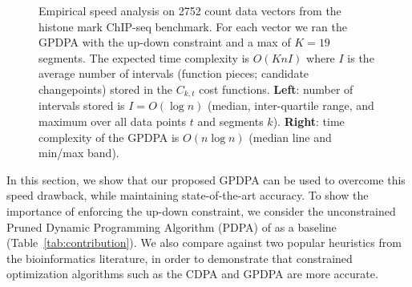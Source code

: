 \documentclass{article}
\begin{document}
\begin{figure}[t!]
  \centering
  \parbox{0.49\textwidth}{
    
  }
  \parbox{0.49\textwidth}{
    
  }
  \vskip -0.8cm
  \caption{Empirical speed analysis on 2752 count data vectors from
    the histone mark ChIP-seq benchmark. For each vector we ran the
    GPDPA with the up-down constraint and a max of $K=19$
    segments. The expected time complexity is $O(KnI)$ where $I$ is
    the average number of intervals (function pieces; candidate
    changepoints) stored in the $C_{k,t}$ cost
    functions. \textbf{Left}: number of intervals stored is
    $I=O(\log n)$ (median, inter-quartile range, and maximum over all
    data points $t$ and segments $k$).  \textbf{Right}: time
    complexity of the GPDPA is $O(n\log n)$ (median line and min/max
    band).}
  \label{fig:timings}
\end{figure}

In this section, we show that our proposed GPDPA can be used to
overcome this speed drawback, while maintaining state-of-the-art
accuracy. To show the importance of enforcing the up-down constraint,
we consider the unconstrained Pruned Dynamic Programming Algorithm
(PDPA) of \citet{pruned-dp} as a baseline
(Table~\ref{tab:contribution}). We also compare against two popular
heuristics from the bioinformatics literature, in order to demonstrate
that constrained optimization algorithms such as the CDPA and GPDPA
are more accurate.
\end{document}
